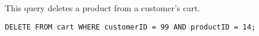 This query deletes a product from a customer's cart.

\begin{lstlisting}
DELETE FROM cart WHERE customerID = 99 AND productID = 14;
\end{lstlisting}